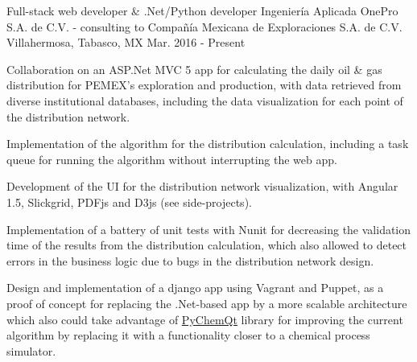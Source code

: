 


\begin{cventries}


\cventry
{Full-stack web developer \& .Net/Python developer} %
{Ingeniería Aplicada OnePro S.A. de C.V. - consulting to Compañía Mexicana de Exploraciones S.A. de C.V.} %
{Villahermosa, Tabasco, MX} %
{Mar. 2016 - Present} %
{ %
	\begin{cvitems}
		\item{Collaboration on an ASP.Net MVC 5 app for calculating the daily oil \& gas distribution for PEMEX's exploration and production, with data retrieved from diverse institutional databases, including the data visualization for each point of the distribution network.}
		\item{Implementation of the algorithm for the distribution calculation, including a task queue for running the algorithm without interrupting the web app.}
		\item{Development of the UI for the distribution network visualization, with Angular 1.5, Slickgrid, PDFjs and D3js {\tiny (see side-projects)}.}
		\item {Implementation of a battery of unit tests with Nunit for decreasing the validation time of the results from the distribution calculation, which also allowed to detect errors in the business logic due to bugs in the distribution network design.}
		\item{Design and implementation of a django app using Vagrant and Puppet, as a proof of concept for replacing the .Net-based app by a more scalable architecture which also could take advantage of \href{https://github.com/jjgomera/pychemqt}{PyChemQt} library for improving the current algorithm by replacing it with a functionality closer to a chemical process simulator.}
	\end{cvitems}
}


\end{cventries}
